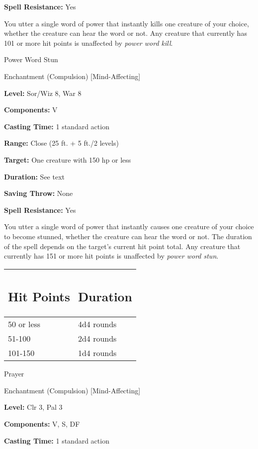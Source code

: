 \documentclass{article}
\begin{document}
\textbf{Spell Resistance:} Yes

You utter a single word of power that instantly kills one creature of your choice, 
whether the creature can hear the word or not. Any creature that currently has 
101 or more hit points is unaffected by \textit{power word kill}.

\vspace{12pt}
Power Word Stun

Enchantment (Compulsion) [Mind-Affecting]

\textbf{Level:} Sor/Wiz 8, War 8

\textbf{Components:} V

\textbf{Casting Time:} 1 standard action

\textbf{Range:} Close (25 ft. + 5 ft./2 levels)

\textbf{Target:} One creature with 150 hp or less

\textbf{Duration:} See text

\textbf{Saving Throw:} None

\textbf{Spell Resistance:} Yes

You utter a single word of power that instantly causes one creature of your choice 
to become stunned, whether the creature can hear the word or not. The duration 
of the spell depends on the target's current hit point total. Any creature that 
currently has 151 or more hit points is unaffected by \textit{power word stun}.

\begin{tabular}{|>{\raggedright}p{41pt}|>{\raggedright}p{43pt}|}
\hline
\subsection*{H\textbf{it Points}} & \subsection*{D\textbf{uration}}\tabularnewline
\hline
50 or less & 4d4 rounds\tabularnewline
\hline
51-100 & 2d4 rounds\tabularnewline
\hline
101-150 & 1d4 rounds\tabularnewline
\hline
\end{tabular}

\vspace{12pt}
Prayer

Enchantment (Compulsion) [Mind-Affecting]

\textbf{Level:} Clr 3, Pal 3

\textbf{Components:} V, S, DF

\textbf{Casting Time:} 1 standard action
\end{document}
